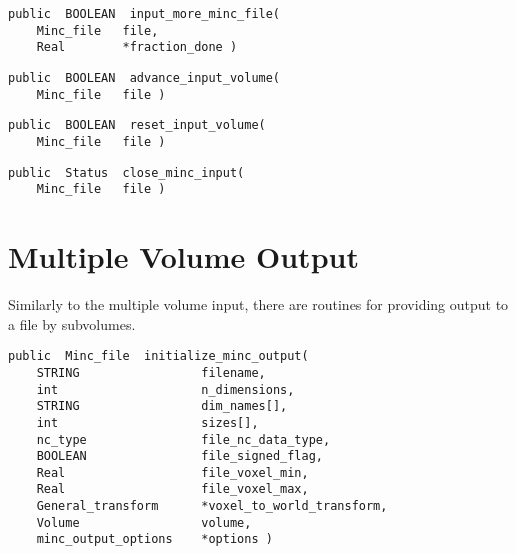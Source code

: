 {\bf\begin{verbatim}
public  BOOLEAN  input_more_minc_file(
    Minc_file   file,
    Real        *fraction_done )
\end{verbatim}}


{\bf\begin{verbatim}
public  BOOLEAN  advance_input_volume(
    Minc_file   file )
\end{verbatim}}


{\bf\begin{verbatim}
public  BOOLEAN  reset_input_volume(
    Minc_file   file )
\end{verbatim}}


{\bf\begin{verbatim}
public  Status  close_minc_input(
    Minc_file   file )
\end{verbatim}}


\section{Multiple Volume Output}

Similarly to the multiple volume input, there are routines for
providing output to a file by subvolumes.

{\bf\begin{verbatim}
public  Minc_file  initialize_minc_output(
    STRING                 filename,
    int                    n_dimensions,
    STRING                 dim_names[],
    int                    sizes[],
    nc_type                file_nc_data_type,
    BOOLEAN                file_signed_flag,
    Real                   file_voxel_min,
    Real                   file_voxel_max,
    General_transform      *voxel_to_world_transform,
    Volume                 volume,
    minc_output_options    *options )
\end{verbatim}}

